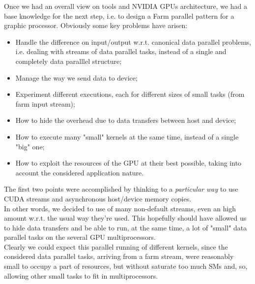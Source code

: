 Once we had an overall view on tools and NVIDIA GPUs architecture, we had a base knowledge for the next step, i.e. to design a Farm parallel pattern for a graphic processor. Obviously some key problems have arisen:
\begin{itemize}
	\item Handle the difference on input/output w.r.t. canonical data parallel problems, i.e. dealing with streams of data parallel tasks, instead of a single and completely data paralllel structure;
	\item Manage the way we send data to device;
	\item Experiment different executions, each for different sizes of small tasks (from farm input stream);
	\item How to hide the overhead due to data transfers between host and device;
	\item How to execute many "small" kernels at the same time, instead of a single "big" one;
	\item How to exploit the resources of the GPU at their best possible, taking into account the considered application nature.
\end{itemize}
The first two points were accomplished by thinking to a \textit{particular way} to use CUDA streams and asynchronous host/device memory copies.\\
In other words, we decided to use of many non-default streams, even an high amount w.r.t. the usual way they're used.
This hopefully should have allowed us to hide data transfers and be able to run, at the same time, a lot of "small" data parallel tasks on the several GPU multiprocessors.\\
Clearly we could expect this parallel running of different kernels, since the considered data parallel tasks, arriving from a farm stream, were reasonably small to occupy a part of resources, but without saturate too much SMs and, so, allowing other small tasks to fit in multiprocessors.\\ 

